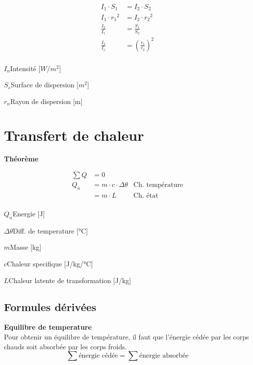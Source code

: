 \documentclass[12pt,a4paper]{article} %
\newcommand\frametitle[1]{ {\bfseries #1} \\[5pt] }
\begin{document}
\begin{twocols}[0.5][0.5]
	\begin{align*}
		I_1 \cdot S_1 &= I_2 \cdot S_2 \\
		I_1 \cdot {r_1}^2 &= I_2 \cdot {r_2}^2	\\[1em]
		\frac{I_2}{I_1} &= \frac{S_1}{S_2} \\
		\frac{I_2}{I_1} &= \left(\frac{r_1}{r_2}\right)^2 \\
	\end{align*}
\nextcol
	\begin{vardef}
		\item{$I_n$}{Intensité [$W/m^2$]}
		\item{$S_s$}{Surface de dispersion [$m^2$]}
		\item{$r_n$}{Rayon de dispersion [m]}
	\end{vardef}
\end{twocols}
\section{Transfert de chaleur}

\begin{mdframed}
	\frametitle{Théorème}
	\begin{twocols}
		\begin{align*}
			\sum Q &= 0 \\[1em]
			Q_n &= m \cdot c \cdot \Delta\theta & \text{Ch. température} \\
			&= m \cdot L & \text{Ch. état} \\
		\end{align*}
	\nextcol
		\begin{vardef}
			\item{$Q_n$}{Energie [J]}
			\item{$\Delta\theta$}{Diff. de temperature [°C]}
			\item{$m$}{Masse [kg]}
			\item{$c$}{Chaleur specifique [J/kg/°C]}
			\item{$L$}{Chaleur latente de transformation [J/kg]}
		\end{vardef}
	\end{twocols}
\end{mdframed}

\subsection{Formules dérivées}

\frametitle{Equilibre de temperature}
Pour obtenir un équilibre de température, il faut que l'énergie cédée par les corps chauds soit absorbée par les corps froids.
\[\sum \text{énergie cédée} = \sum \text{énergie absorbée}\]
\end{document}
